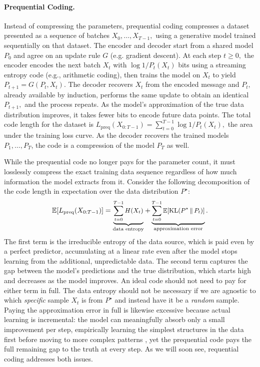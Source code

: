 \documentclass{article}
\theoremstyle{plain}
\theoremstyle{definition}
\theoremstyle{remark}
\begin{document}
\paragraph{Prequential Coding.} \label{sec:preq}
%
Instead of compressing the parameters, prequential coding \citep{dawid1984present, rissanen2003universal} compresses a dataset presented as a sequence of batches $X_0,\dots,X_{T-1},$ using a generative model trained sequentially on that dataset. The encoder and decoder start from a shared model $P_0$ and agree on an update rule $G$ (e.g. gradient descent). At each step $t \geq 0,$ the encoder encodes the next batch $X_t$ with $\log 1/ P_t(X_t)$ bits using a streaming entropy code (e.g., arithmetic coding), then trains the model on $X_t$ to yield $P_{t+1} = G(P_t, X_t)$. The decoder recovers $X_t$ from the encoded message and $P_t,$ already available by induction, performs the same update to obtain an identical $P_{t+1},$ and the process repeats. As the model's approximation of the true data distribution improves, it takes fewer bits to encode future data points. The total code length for the dataset is $
L_{\mathrm{preq}}(X_{0:T-1})=\sum_{t=0}^{T-1}\log 1/ P_t(X_t),$
the area under the training loss curve. As the decoder recovers the trained models $P_1, \ldots, P_T$, the code is a compression of the model $P_T$ as well.

While the prequential code no longer pays for the parameter count, it must losslessly compress the exact training data sequence regardless of how much information the model extracts from it. Consider the following decomposition of the code length in expectation over the data distribution $P^\star:$
\begin{equation}
\small
\mathbb{E}[L_{\mathrm{preq}}(X_{0:T-1})] = \underbrace{\sum_{t=0}^{T-1} H(X_t)}_{\text{data entropy}} + \underbrace{\sum_{t=0}^{T-1} \mathbb{E}[\mathrm{KL}(P^\star \,\|\, P_t)]}_{\text{approximation error}}.
\end{equation}
The first term is the irreducible entropy of the data source, which is paid even by a perfect predictor, accumulating at a linear rate even after the model stops learning from the additional, unpredictable data. The second term captures the gap between the model's predictions and the true distribution, which starts high and decreases as the model improves. An ideal code should not need to pay for either term in full. The data entropy should not be necessary if we are agnostic to which \emph{specific} sample $X_t$ is from $P^\star$ and instead have it be a \emph{random} sample. Paying the approximation error in full is likewise excessive because actual learning is incremental: the model can meaningfully absorb only a small improvement per step, empirically learning the simplest structures in the data first before moving to more complex patterns \citep{kalimeris2019sgd,liu2021probing,saphra2019understanding}, yet the prequential code pays the full remaining gap to the truth at every step. As we will soon see, requential coding addresses both issues.
\end{document}

